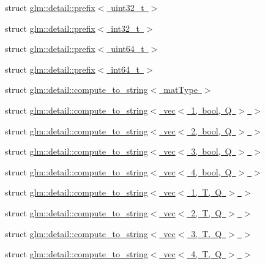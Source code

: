 \begin{DoxyCompactItemize}
\item 
struct \mbox{\hyperlink{structglm_1_1detail_1_1prefix_3_01uint32__t_01_4}{glm\+::detail\+::prefix$<$ uint32\+\_\+t $>$}}
\item 
struct \mbox{\hyperlink{structglm_1_1detail_1_1prefix_3_01int32__t_01_4}{glm\+::detail\+::prefix$<$ int32\+\_\+t $>$}}
\item 
struct \mbox{\hyperlink{structglm_1_1detail_1_1prefix_3_01uint64__t_01_4}{glm\+::detail\+::prefix$<$ uint64\+\_\+t $>$}}
\item 
struct \mbox{\hyperlink{structglm_1_1detail_1_1prefix_3_01int64__t_01_4}{glm\+::detail\+::prefix$<$ int64\+\_\+t $>$}}
\item 
struct \mbox{\hyperlink{structglm_1_1detail_1_1compute__to__string}{glm\+::detail\+::compute\+\_\+to\+\_\+string$<$ mat\+Type $>$}}
\item 
struct \mbox{\hyperlink{structglm_1_1detail_1_1compute__to__string_3_01vec_3_011_00_01bool_00_01_q_01_4_01_4}{glm\+::detail\+::compute\+\_\+to\+\_\+string$<$ vec$<$ 1, bool, Q $>$ $>$}}
\item 
struct \mbox{\hyperlink{structglm_1_1detail_1_1compute__to__string_3_01vec_3_012_00_01bool_00_01_q_01_4_01_4}{glm\+::detail\+::compute\+\_\+to\+\_\+string$<$ vec$<$ 2, bool, Q $>$ $>$}}
\item 
struct \mbox{\hyperlink{structglm_1_1detail_1_1compute__to__string_3_01vec_3_013_00_01bool_00_01_q_01_4_01_4}{glm\+::detail\+::compute\+\_\+to\+\_\+string$<$ vec$<$ 3, bool, Q $>$ $>$}}
\item 
struct \mbox{\hyperlink{structglm_1_1detail_1_1compute__to__string_3_01vec_3_014_00_01bool_00_01_q_01_4_01_4}{glm\+::detail\+::compute\+\_\+to\+\_\+string$<$ vec$<$ 4, bool, Q $>$ $>$}}
\item 
struct \mbox{\hyperlink{structglm_1_1detail_1_1compute__to__string_3_01vec_3_011_00_01_t_00_01_q_01_4_01_4}{glm\+::detail\+::compute\+\_\+to\+\_\+string$<$ vec$<$ 1, T, Q $>$ $>$}}
\item 
struct \mbox{\hyperlink{structglm_1_1detail_1_1compute__to__string_3_01vec_3_012_00_01_t_00_01_q_01_4_01_4}{glm\+::detail\+::compute\+\_\+to\+\_\+string$<$ vec$<$ 2, T, Q $>$ $>$}}
\item 
struct \mbox{\hyperlink{structglm_1_1detail_1_1compute__to__string_3_01vec_3_013_00_01_t_00_01_q_01_4_01_4}{glm\+::detail\+::compute\+\_\+to\+\_\+string$<$ vec$<$ 3, T, Q $>$ $>$}}
\item 
struct \mbox{\hyperlink{structglm_1_1detail_1_1compute__to__string_3_01vec_3_014_00_01_t_00_01_q_01_4_01_4}{glm\+::detail\+::compute\+\_\+to\+\_\+string$<$ vec$<$ 4, T, Q $>$ $>$}}

\end{DoxyCompactItemize}
